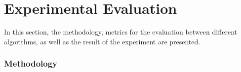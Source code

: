 \chapter{Experimental Evaluation} %

\label{Chapter4}

In this section, the methodology, metrics for the evaluation between different algorithms, as well as the result of the experiment are presented.

\subsection{Methodology}
